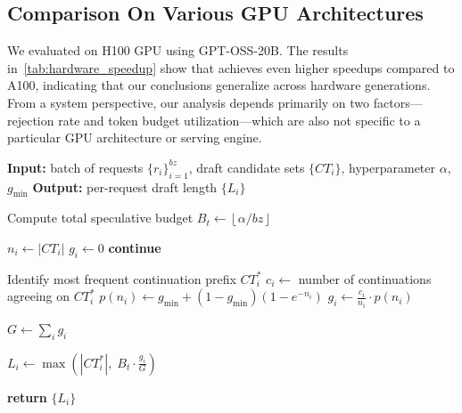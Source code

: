 \subsection{Comparison On Various GPU Architectures} We evaluated \sysname on H100 GPU using GPT-OSS-20B. The results in~\cref{tab:hardware_speedup} show that \sysname achieves even higher speedups compared to A100, indicating that our conclusions generalize across hardware generations. From a system perspective, our analysis depends primarily on two factors—rejection rate and token budget utilization—which are also not specific to a particular GPU architecture or serving engine. 

\label{appendix:algorithm_pseudocode}
\begin{algorithm}[ht]
\caption{Redundancy-Aware Budget Allocation}
\label{algo:redundancy_aware_budget}
\begin{algorithmic}[1]
    \STATE \textbf{Input:} batch of requests $\{r_i\}_{i=1}^{bz}$, draft candidate sets $\{CT_i\}$, hyperparameter $\alpha$, $g_{\min}$
    \STATE \textbf{Output:} per-request draft length $\{L_i\}$
    
    \STATE Compute total speculative budget $B_t \gets \left\lfloor \alpha / bz \right\rfloor$
    
        \STATE $n_i \gets |CT_i|$ 
            \STATE $g_i \gets 0$
            \STATE \textbf{continue}
        \ENDIF
        
        \STATE Identify most frequent continuation prefix $CT_i^{*}$
        \STATE $c_i \gets$ number of continuations agreeing on $CT_i^{*}$
        \STATE $p(n_i) \gets g_{\min} + (1 - g_{\min})(1 - e^{-n_i})$
        \STATE $g_i \gets \frac{c_i}{n_i} \cdot p(n_i)$
    \ENDFOR
    
    \STATE $G \gets \sum_i g_i$
    
        \STATE $L_i \gets \max\left(|CT_i^{*}|,\; B_t \cdot \frac{g_i}{G}\right)$
    \ENDFOR
    
    \STATE \textbf{return} $\{L_i\}$
\end{algorithmic}
\end{algorithm}


